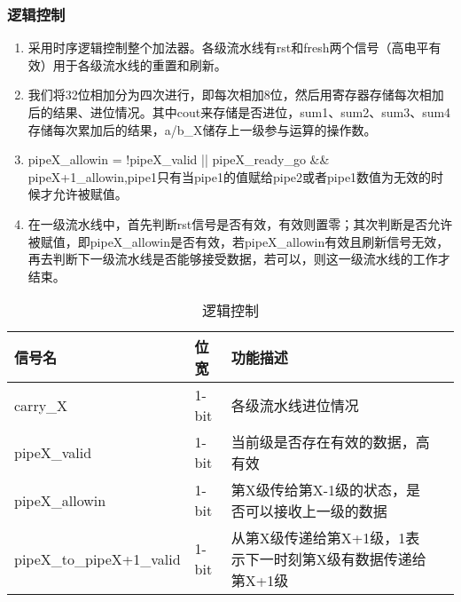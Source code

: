 \subsubsection{逻辑控制}
\begin{enumerate}
    \item 采用时序逻辑控制整个加法器。各级流水线有rst和fresh两个信号（高电平有效）用于各级流水线的重置和刷新。
    \item 我们将32位相加分为四次进行，即每次相加8位，然后用寄存器存储每次相加后的结果、进位情况。其中cout来存储是否进位，sum1、sum2、sum3、sum4存储每次累加后的结果，a/b\_X储存上一级参与运算的操作数。
    \item pipeX\_allowin = !pipeX\_valid || pipeX\_ready\_go && pipeX+1\_allowin,pipe1只有当pipe1的值赋给pipe2或者pipe1数值为无效的时候才允许被赋值。
    \item 在一级流水线中，首先判断rst信号是否有效，有效则置零；其次判断是否允许被赋值，即pipeX\_allowin是否有效，若pipeX\_allowin有效且刷新信号无效，再去判断下一级流水线是否能够接受数据，若可以，则这一级流水线的工作才结束。
\end{enumerate}
\begin{table}[htp]
	\caption{逻辑控制}
	\begin{center}
		\begin{tabular}{lllp{8cm}}
		\hline
		\textbf{信号名}  & \textbf{位宽} & \textbf{功能描述}\\ \hline
		carry\_X & 1-bit & 各级流水线进位情况 \\
		pipeX\_valid & 1-bit & 当前级是否存在有效的数据，高有效\\
		pipeX\_allowin & 1-bit & 第X级传给第X-1级的状态，是否可以接收上一级的数据 \\
		pipeX\_to\_pipeX+1\_valid & 1-bit & 从第X级传递给第X+1级，1表示下一时刻第X级有数据传递给第X+1级 \\
		\hline
		\end{tabular}
	\end{center}
	\end{table}